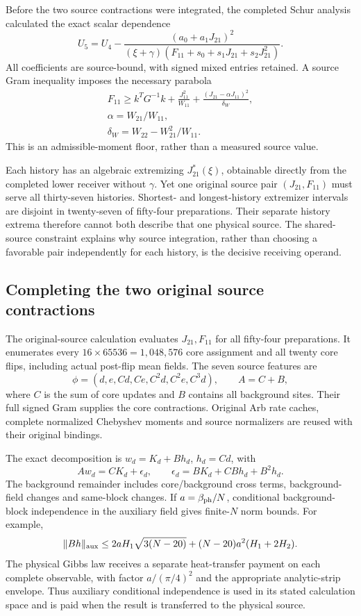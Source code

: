 Before the two source contractions were integrated, the completed Schur analysis calculated the exact scalar dependence
\[
 U_5=U_4-
 \frac{(a_0+a_1J_{21})^2}
 {(\xi+\gamma)(F_{11}+s_0+s_1J_{21}+s_2J_{21}^2)}.
\]
All coefficients are source-bound, with signed mixed entries retained. A source Gram inequality imposes the necessary parabola
\[
\begin{gathered}
F_{11}\geq k^TG^{-1}k+\frac{J_{11}^2}{W_{11}}
 +\frac{(J_{21}-\alpha J_{11})^2}{\delta_W},
 \\
\alpha=W_{21}/W_{11},\\
\delta_W=W_{22}-W_{21}^2/W_{11}.
\end{gathered}
\]
This is an admissible-moment floor, rather than a measured source value. 

Each history has an algebraic extremizing $J_{21}^*(\xi)$, obtainable directly from the completed lower receiver without $\gamma$. Yet one original source pair $(J_{21},F_{11})$ must serve all thirty-seven histories. Shortest- and longest-history extremizer intervals are disjoint in twenty-seven of fifty-four preparations. Their separate history extrema therefore cannot both describe that one physical source. The shared-source constraint explains why source integration, rather than choosing a favorable pair independently for each history, is the decisive receiving operand.

\subsection{Completing the two original source contractions}

The original-source calculation evaluates $J_{21},F_{11}$ for all fifty-four preparations. It enumerates every $16\times65536=1{,}048{,}576$ core assignment and all twenty core flips, including actual post-flip mean fields. The seven source features are
\[
 \phi=(d,e,Cd,Ce,C^2d,C^2e,C^3d),\qquad A=C+B,
\]
where $C$ is the sum of core updates and $B$ contains all background sites. Their full signed Gram supplies the core contractions. Original Arb rate caches, complete normalized Chebyshev moments and source normalizers are reused with their original bindings. 

The exact decomposition is $w_d=K_d+Bh_d$, $h_d=Cd$, with
\[
 Aw_d=CK_d+\epsilon_d,
 \qquad\epsilon_d=BK_d+CBh_d+B^2h_d.
\]
The background remainder includes core/background cross terms, background-field changes and same-block changes. If $a=\beta_{\rm ph}/N$, conditional background-block independence in the auxiliary field gives finite-$N$ norm bounds. For example,
\[
 \|Bh\|_{\rm aux}\leq
 2aH_1\sqrt{3(N-20)}+(N-20)a^2(H_1+2H_2).
\]
The physical Gibbs law receives a separate heat-transfer payment on each complete observable, with factor $a/(\pi/4)^2$ and the appropriate analytic-strip envelope. Thus auxiliary conditional independence is used in its stated calculation space and is paid when the result is transferred to the physical source.

